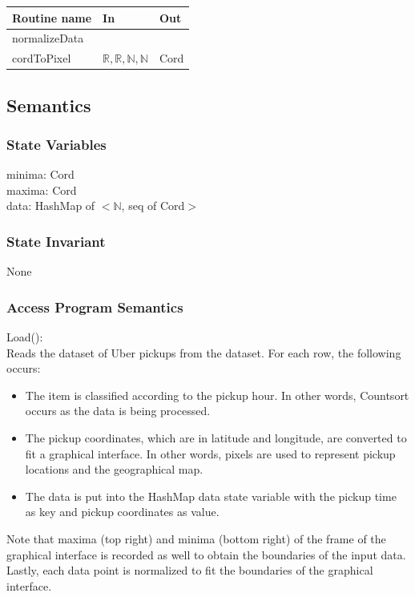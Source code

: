 \documentclass[12pt]{article}
\begin{document}
\begin{tabular}{| l | l | l |}
\hline
\textbf{Routine name} & \textbf{In} & \textbf{Out}\\
\hline
normalizeData & ~ & ~ \\
\hline
cordToPixel & $\mathbb{R}, \mathbb{R}, \mathbb{N}, \mathbb{N}$ & Cord\\
\hline
\end{tabular}

\subsection* {Semantics}

\subsubsection* {State Variables}

minima: Cord\\
maxima: Cord\\
data: HashMap of $<\mathbb{N}$, seq of Cord$>$

\subsubsection* {State Invariant}

None

\subsubsection* {Access Program Semantics}

Load():\\
\noindent
Reads the dataset of Uber pickups from the dataset. For each row, the following occurs:
\begin{itemize}
\item The item is classified according to the pickup hour. In other words, Countsort occurs
as the data is being processed.
\item The pickup coordinates, which are in latitude and longitude, are converted to fit
a graphical interface. In other words, pixels are used to represent pickup locations
and the geographical map.
\item The data is put into the HashMap data state variable with the pickup time as key and 
pickup coordinates as value.
\end{itemize}
Note that maxima (top right) and minima (bottom right) of the frame of the graphical
interface is recorded as well to obtain the boundaries of the input data.\\
\noindent
Lastly, each data point is normalized to fit the boundaries of the graphical interface.\\
\end{document}
